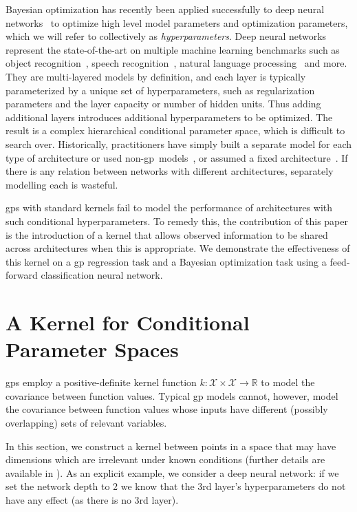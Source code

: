 \documentclass{article}
\newcommand{\sX}{\mathcal{X}}
\newcommand{\gp}{{\sc gp}}
\begin{document}
Bayesian optimization has recently been applied successfully to deep neural networks~\cite{snoek-etal-2012b, bergstra2011algorithms} to optimize high level model parameters and optimization parameters, which we will refer to collectively as \emph{hyperparameters}.  Deep neural networks represent the state-of-the-art on multiple machine learning benchmarks such as object recognition~\cite{krizhevsky-2012}, speech recognition~\cite{deepSpeechReviewSPM2012}, natural language processing~\cite{mikolov2010recurrent} and more.
They are multi-layered models by definition, and each layer is typically parameterized by a unique set of hyperparameters, such as regularization parameters and the layer capacity or number of hidden units.  Thus adding additional layers introduces additional hyperparameters to be optimized.  The result is a complex hierarchical conditional parameter space, which is difficult to search over.  Historically, practitioners have simply built a separate model for each type of architecture or used non-\gp~models~\cite{bergstra2011algorithms}, or assumed a fixed architecture~\cite{snoek-etal-2012b}.  If there is any relation between networks with different architectures, separately modelling each is wasteful. 

\gp s with standard kernels fail to model the performance of architectures with such conditional hyperparameters. To remedy this, 
the contribution of this paper is the introduction of a kernel that allows observed information to be shared across architectures when this is appropriate. We demonstrate the effectiveness of this kernel on a \gp{} regression task and a Bayesian optimization task using a feed-forward classification neural network. 


\section{A Kernel for Conditional Parameter Spaces}
\vspace{-0.05in} 

\gp{}s employ a positive-definite kernel function $k: \sX \times \sX \rightarrow \mathbb{R}$ to model the covariance between function values. Typical \gp{} models cannot, however, model the covariance between function values whose inputs have different (possibly overlapping) sets of relevant variables.

In this section, we construct a kernel between points in a space that may have dimensions which are irrelevant under known conditions (further details are available in \cite{arxiv_hierarchical_kernel}). As an explicit example, we consider a deep neural network: if we set the network depth to 2 we know that the 3rd layer's hyperparameters do not have any effect (as there is no 3rd layer).
\end{document}
